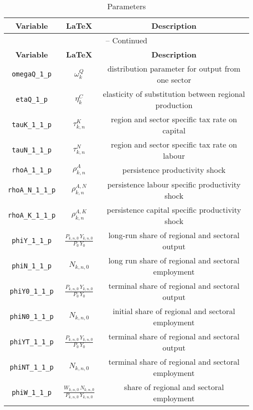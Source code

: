 \begin{center}
\begin{longtable}{ccc}
\caption{Parameters}\\%
\hline%
\multicolumn{1}{c}{\textbf{Variable}} &
\multicolumn{1}{c}{\textbf{\LaTeX}} &
\multicolumn{1}{c}{\textbf{Description}}\\%
\hline\hline%
\endfirsthead
\multicolumn{3}{c}{{\tablename} \thetable{} -- Continued}\\%
\hline%
\multicolumn{1}{c}{\textbf{Variable}} &
\multicolumn{1}{c}{\textbf{\LaTeX}} &
\multicolumn{1}{c}{\textbf{Description}}\\%
\hline\hline%
\endhead
\texttt{omegaQ\_1\_p} & ${\omega^{Q}_{k}}$ & distribution parameter for output from one sector\\
\texttt{etaQ\_1\_p} & ${\eta^{C}_{k}}$ & elasticity of substitution between regional production\\
\texttt{tauK\_1\_1\_p} & ${\tau^{K}_{k,n}}$ & region and sector specific tax rate on capital\\
\texttt{tauN\_1\_1\_p} & ${\tau^{N}_{k,n}}$ & region and sector specific tax rate on labour\\
\texttt{rhoA\_1\_1\_p} & ${\rho^{A}_{k,n}}$ & persistence productivity shock\\
\texttt{rhoA\_N\_1\_1\_p} & ${\rho^{A,N}_{k,n}}$ & persistence labour specific productivity shock\\
\texttt{rhoA\_K\_1\_1\_p} & ${\rho^{A,K}_{k,n}}$ & persistence capital specific productivity shock\\
\texttt{phiY\_1\_1\_p} & $\frac{P_{k,n,0} \, Y_{k,n,0}}{P_{0} \, Y_{0}}$ & long-run share of regional and sectoral output\\
\texttt{phiN\_1\_1\_p} & ${N_{k,n,0}}$ & long run share of regional and sectoral employment\\
\texttt{phiY0\_1\_1\_p} & $\frac{P_{k,n,0} \, Y_{k,n,0}}{P_{0} \, Y_{0}}$ & terminal share of regional and sectoral output\\
\texttt{phiN0\_1\_1\_p} & ${N_{k,n,0}}$ & initial share of regional and sectoral employment\\
\texttt{phiYT\_1\_1\_p} & $\frac{P_{k,n,0} \, Y_{k,n,0}}{P_{0} \, Y_{0}}$ & terminal share of regional and sectoral output\\
\texttt{phiNT\_1\_1\_p} & ${N_{k,n,0}}$ & terminal share of regional and sectoral employment\\
\texttt{phiW\_1\_1\_p} & $\frac{W_{k,n,0} \, N_{k,n,0}}{P_{k,n,0} \, Y_{k,n,0}}$ & share of regional and sectoral employment\\

\end{longtable}
\end{center}

